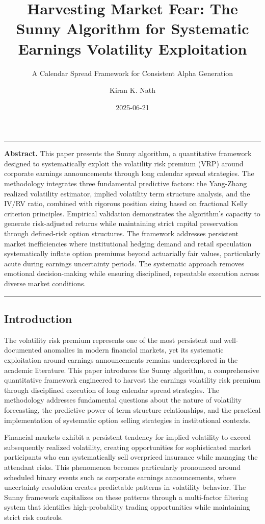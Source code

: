 \documentclass[
  american,
  11pt,
  11pt,
  letterpaper,
  onecolumn]{article}
\title{Harvesting Market Fear: The Sunny Algorithm for Systematic
Earnings Volatility Exploitation}
\subtitle{A Calendar Spread Framework for Consistent Alpha Generation}
\author{Kiran K. Nath}
\date{2025-06-21}
\renewenvironment{abstract}
  {\small\quotation\noindent\rule{\linewidth}{.5pt}\par\smallskip
   \noindent\textbf{Abstract.}\space}
  {\par\smallskip\noindent\rule{\linewidth}{.5pt}\endquotation}
\begin{document}
\maketitle
\begin{abstract}
This paper presents the Sunny algorithm, a quantitative framework
designed to systematically exploit the volatility risk premium (VRP)
around corporate earnings announcements through long calendar spread
strategies. The methodology integrates three fundamental predictive
factors: the Yang-Zhang realized volatility estimator, implied
volatility term structure analysis, and the IV/RV ratio, combined with
rigorous position sizing based on fractional Kelly criterion principles.
Empirical validation demonstrates the algorithm's capacity to generate
risk-adjusted returns while maintaining strict capital preservation
through defined-risk option structures. The framework addresses
persistent market inefficiencies where institutional hedging demand and
retail speculation systematically inflate option premiums beyond
actuarially fair values, particularly acute during earnings uncertainty
periods. The systematic approach removes emotional decision-making while
ensuring disciplined, repeatable execution across diverse market
conditions.
\end{abstract}


\subsection{Introduction}\label{introduction}

The volatility risk premium represents one of the most persistent and
well-documented anomalies in modern financial markets, yet its
systematic exploitation around earnings announcements remains
underexplored in the academic literature. This paper introduces the
Sunny algorithm, a comprehensive quantitative framework engineered to
harvest the earnings volatility risk premium through disciplined
execution of long calendar spread strategies. The methodology addresses
fundamental questions about the nature of volatility forecasting, the
predictive power of term structure relationships, and the practical
implementation of systematic option selling strategies in institutional
contexts.

Financial markets exhibit a persistent tendency for implied volatility
to exceed subsequently realized volatility, creating opportunities for
sophisticated market participants who can systematically sell overpriced
insurance while managing the attendant risks. This phenomenon becomes
particularly pronounced around scheduled binary events such as corporate
earnings announcements, where uncertainty resolution creates predictable
patterns in volatility behavior. The Sunny framework capitalizes on
these patterns through a multi-factor filtering system that identifies
high-probability trading opportunities while maintaining strict risk
controls.
\end{document}
